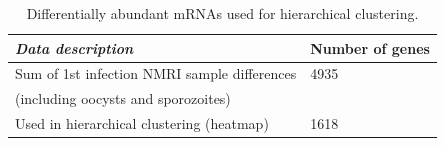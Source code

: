 \documentclass{article}
\begin{document}
\setlength{\tabcolsep}{10pt}
\begin{table}[H]
\small
\begin{center}
\caption{Differentially abundant mRNAs used for hierarchical clustering.}
\begin{tabular}{*2l}    \toprule
	\textit{Data description} & Number of genes \\ \midrule
	Sum of 1st infection NMRI sample differences	& 4935  \\ 
	(including oocysts and sporozoites)	\\	
	Used in hierarchical clustering (heatmap)  	& 1618 \\ 	\bottomrule	
\hline
\end{tabular}
\end{center}
\end{table}
\end{document}
